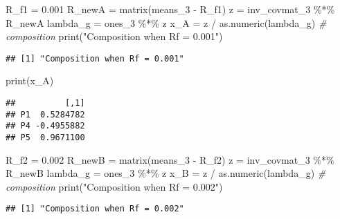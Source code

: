 \documentclass[
]{article}
\newenvironment{Shaded}{\begin{snugshade}}{\end{snugshade}}
\newcommand{\CommentTok}[1]{\textcolor[rgb]{0.56,0.35,0.01}{\textit{#1}}}
\newcommand{\FloatTok}[1]{\textcolor[rgb]{0.00,0.00,0.81}{#1}}
\newcommand{\FunctionTok}[1]{\textcolor[rgb]{0.00,0.00,0.00}{#1}}
\newcommand{\NormalTok}[1]{#1}
\newcommand{\OtherTok}[1]{\textcolor[rgb]{0.56,0.35,0.01}{#1}}
\newcommand{\SpecialCharTok}[1]{\textcolor[rgb]{0.00,0.00,0.00}{#1}}
\newcommand{\StringTok}[1]{\textcolor[rgb]{0.31,0.60,0.02}{#1}}
\begin{document}
\begin{Shaded}
\begin{Highlighting}[]
\NormalTok{R\_f1 }\OtherTok{=} \FloatTok{0.001}
\NormalTok{R\_newA }\OtherTok{=} \FunctionTok{matrix}\NormalTok{(means\_3 }\SpecialCharTok{{-}}\NormalTok{ R\_f1)}
\NormalTok{z }\OtherTok{=}\NormalTok{ inv\_covmat\_3 }\SpecialCharTok{\%*\%}\NormalTok{ R\_newA}
\NormalTok{lambda\_g }\OtherTok{=}\NormalTok{ ones\_3 }\SpecialCharTok{\%*\%}\NormalTok{ z}
\NormalTok{x\_A }\OtherTok{=}\NormalTok{ z }\SpecialCharTok{/} \FunctionTok{as.numeric}\NormalTok{(lambda\_g) }\CommentTok{\# composition}
\FunctionTok{print}\NormalTok{(}\StringTok{"Composition when Rf = 0.001"}\NormalTok{)}
\end{Highlighting}
\end{Shaded}

\begin{verbatim}
## [1] "Composition when Rf = 0.001"
\end{verbatim}

\begin{Shaded}
\begin{Highlighting}[]
\FunctionTok{print}\NormalTok{(x\_A)}
\end{Highlighting}
\end{Shaded}

\begin{verbatim}
##          [,1]
## P1  0.5284782
## P4 -0.4955882
## P5  0.9671100
\end{verbatim}

\begin{Shaded}
\begin{Highlighting}[]
\NormalTok{R\_f2 }\OtherTok{=} \FloatTok{0.002}
\NormalTok{R\_newB }\OtherTok{=} \FunctionTok{matrix}\NormalTok{(means\_3 }\SpecialCharTok{{-}}\NormalTok{ R\_f2)}
\NormalTok{z }\OtherTok{=}\NormalTok{ inv\_covmat\_3 }\SpecialCharTok{\%*\%}\NormalTok{ R\_newB}
\NormalTok{lambda\_g }\OtherTok{=}\NormalTok{ ones\_3 }\SpecialCharTok{\%*\%}\NormalTok{ z}
\NormalTok{x\_B }\OtherTok{=}\NormalTok{ z }\SpecialCharTok{/} \FunctionTok{as.numeric}\NormalTok{(lambda\_g) }\CommentTok{\# composition}
\FunctionTok{print}\NormalTok{(}\StringTok{"Composition when Rf = 0.002"}\NormalTok{)}
\end{Highlighting}
\end{Shaded}

\begin{verbatim}
## [1] "Composition when Rf = 0.002"
\end{verbatim}
\end{document}
